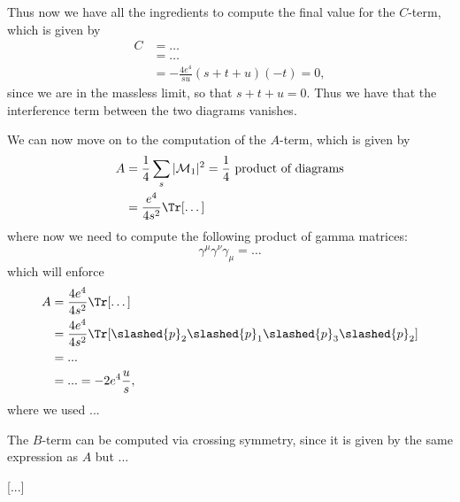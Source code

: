 Thus now we have all the ingredients to compute the final value for the \(C\)-term, which is given by
\[
    \begin{aligned}
        C & = \dots                                   \\
          & = \dots                                   \\
          & = - \frac{4 e^4}{su} (s + t + u)(-t) = 0,
    \end{aligned}
\]
since we are in the massless limit, so that \(s + t + u = 0\). Thus we have that the interference term between the two diagrams vanishes.

We can now move on to the computation of the \(A\)-term, which is given by
\[
    \begin{aligned}
        A & = \frac{1}{4} \sum_{s} \vert \mathcal{M}_1 \vert^2 = \frac{1}{4} \text{ product of diagrams} \\
          & = \frac{e^4}{4 s^2} \Tr[ \dots ]
    \end{aligned}
\]
where now we need to compute the following product of gamma matrices:
\[
    \gamma^{\mu} \gamma^{\nu} \gamma_\mu = \dots
\]
which will enforce
\[
    \begin{aligned}
        A & = \frac{4 e^4}{4 s^2} \Tr[ \dots ]                                                 \\
          & = \frac{4 e^4}{4 s^2} \Tr[\slashed{p}_2 \slashed{p}_1 \slashed{p}_3 \slashed{p}_2] \\
          & = ...                                                                              \\
          & = ... = -2 e^4 \frac{u}{s},
    \end{aligned}
\]
where we used ...

The \(B\)-term can be computed via crossing symmetry, since it is given by the same expression as \(A\) but ...

    [...]

